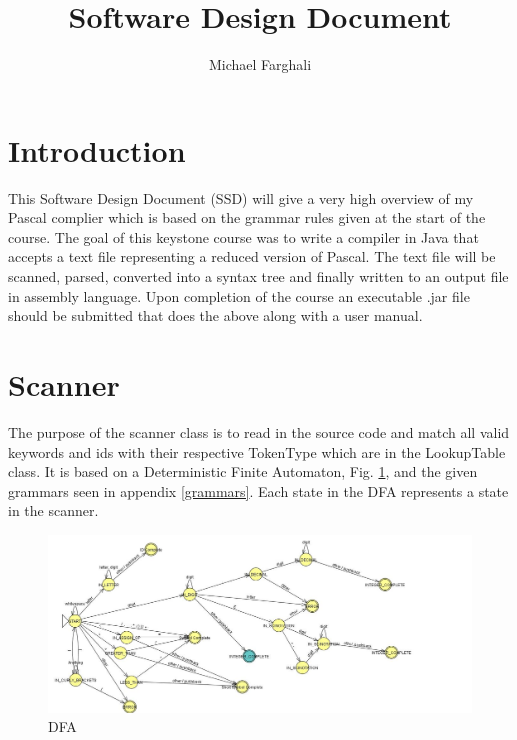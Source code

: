 \documentclass[10]{article}
\title{Software Design Document}
\author{Michael Farghali}
\begin{document}
\maketitle


\section{Introduction}
This Software Design Document (SSD) will give a very high overview of my Pascal complier which is based on the grammar rules given at the start of the course. The goal of this keystone course was to write a compiler in Java that accepts a text file representing a reduced version of Pascal. The text file will be scanned, parsed, converted into a syntax tree and finally written to an output file in assembly language. Upon completion of the course an executable .jar file should be submitted that does the above along with a user manual. 
 
\section{Scanner}

The purpose of the scanner class is to read in the source code and match all valid keywords and ids with their respective TokenType which are in the LookupTable class. It is based on a Deterministic Finite Automaton, Fig. \ref{fig: fg1}, and the given grammars seen in appendix \ref{grammars}. Each state in the DFA represents a state in the scanner. 
\begin{figure}[!ht]
	\includegraphics[width=\textwidth]{ScannerDFA.jpg}
	\caption{DFA \label{fig: fg1}}
	
\end{figure}
\end{document}
